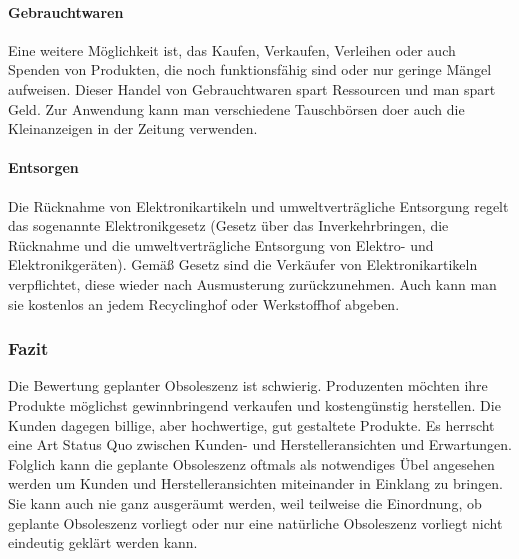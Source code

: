 \documentclass[13pt,titlepage]{article}
\begin{document}
	\paragraph {Gebrauchtwaren}
	Eine weitere M\"oglichkeit ist, das Kaufen, Verkaufen, Verleihen oder auch Spenden von Produkten, die noch funktionsf\"ahig sind oder nur geringe M\"angel aufweisen. 
Dieser Handel von Gebrauchtwaren spart Ressourcen und man spart Geld. 
Zur Anwendung kann man verschiedene Tauschb\"orsen doer auch die Kleinanzeigen in der Zeitung verwenden.
	\paragraph {Entsorgen}
	Die R\"ucknahme von Elektronikartikeln und umweltvertr\"agliche Entsorgung regelt das sogenannte Elektronikgesetz (Gesetz \"uber das Inverkehrbringen, die R\"ucknahme und die umweltvertr\"agliche Entsorgung von Elektro- und Elektronikger\"aten). 
Gem\"aß Gesetz sind die Verk\"aufer von Elektronikartikeln verpflichtet, diese wieder nach Ausmusterung zur\"uckzunehmen. 
Auch kann man sie kostenlos an jedem Recyclinghof oder Werkstoffhof abgeben.
	\subsubsection {Fazit}
	Die Bewertung geplanter Obsoleszenz ist schwierig. 
Produzenten m\"ochten ihre Produkte m\"oglichst gewinnbringend verkaufen und kosteng\"unstig herstellen.
Die Kunden dagegen billige, aber hochwertige, gut gestaltete Produkte. 
Es herrscht eine Art Status Quo zwischen Kunden- und Herstelleransichten und Erwartungen.
Folglich kann die geplante Obsoleszenz oftmals als notwendiges Übel angesehen werden um Kunden und Herstelleransichten miteinander in Einklang zu bringen. 
Sie kann auch nie ganz ausger\"aumt werden, weil teilweise die Einordnung, ob geplante Obsoleszenz vorliegt oder nur eine nat\"urliche Obsoleszenz vorliegt nicht eindeutig gekl\"art werden kann.
\end{document}
